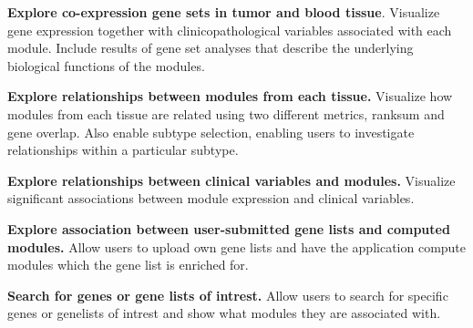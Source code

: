 \textbf{Explore co-expression gene sets in tumor and blood tissue}.
Visualize gene expression together with clinicopathological variables associated
with each module. Include results of gene set analyses that describe the
underlying biological functions of the modules. 

\textbf{Explore relationships between modules from each tissue.}
Visualize how modules from each tissue are related using two different
metrics, ranksum and gene overlap. Also enable subtype selection,
enabling users to investigate relationships within a particular subtype. 

\textbf{Explore relationships between clinical variables and modules.}
Visualize significant associations between module expression and
clinical variables.

\textbf{Explore association between user-submitted gene lists and computed
modules.} Allow users to upload own gene lists and have the application compute
modules which the gene list is enriched for. 

\textbf{Search for genes or gene lists of intrest.} Allow users to search
for specific genes or genelists of intrest and show what modules they are
associated with. 

